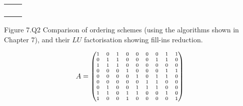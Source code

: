 \begin{enumerate}
    \begin{center}
        \renewcommand{\arraystretch}{0.6}
        \setlength{\tabcolsep}{6pt}
        \begin{tabular}{p{0.45\linewidth} p{0.45\linewidth}}
             & \\
             & \\
             & \\
             & \\
        \end{tabular}
    \end{center}
    Figure 7.Q2 Comparison of ordering schemes (using the algorithms shown in
    \break Chapter 7), and their $LU$ factorisation showing fill-ins reduction.

    \newpage
    \begin{minipage}[t]{0.5\linewidth}
        \begin{align*}
            \scriptsize
            A = \begin{pmatrix}
                1 & 0 & 1 & 0 & 0 & 0 & 0 & 1 & 1\\
                0 & 1 & 1 & 0 & 0 & 0 & 1 & 1 & 0\\
                1 & 1 & 1 & 0 & 0 & 0 & 0 & 0 & 0\\
                0 & 0 & 0 & 1 & 0 & 0 & 0 & 1 & 1\\
                0 & 0 & 0 & 0 & 1 & 0 & 1 & 1 & 0\\
                0 & 0 & 0 & 0 & 0 & 1 & 1 & 0 & 0\\
                0 & 1 & 0 & 0 & 1 & 1 & 1 & 0 & 0\\
                1 & 1 & 0 & 1 & 1 & 0 & 0 & 1 & 0\\
                1 & 0 & 0 & 1 & 0 & 0 & 0 & 0 & 1
            \end{pmatrix}
        \end{align*}
    \end{minipage}
    \begin{minipage}[t]{0.45\linewidth}
        
    \end{minipage}


\end{enumerate}
